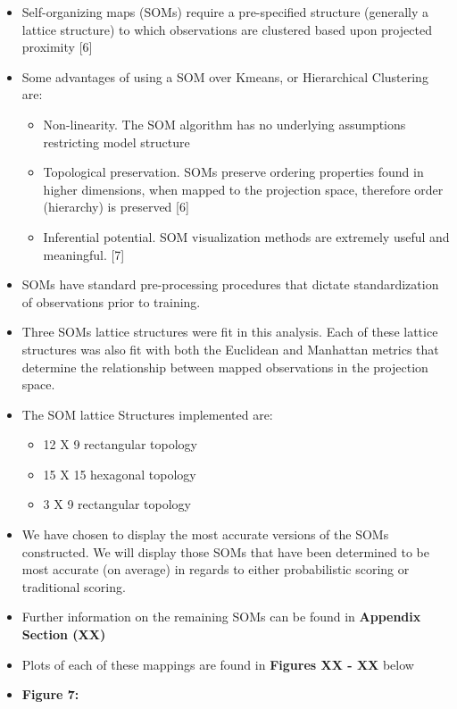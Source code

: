 \documentclass[12pt,]{article}
\providecommand{\tightlist}{%
  \setlength{\itemsep}{0pt}\setlength{\parskip}{0pt}}
\begin{document}
\begin{itemize}
\item
  Self-organizing maps (SOMs) require a pre-specified structure
  (generally a lattice structure) to which observations are clustered
  based upon projected proximity {[}6{]}
\item
  Some advantages of using a SOM over Kmeans, or Hierarchical Clustering
  are:

  \begin{itemize}
  \tightlist
  \item
    Non-linearity. The SOM algorithm has no underlying assumptions
    restricting model structure
  \item
    Topological preservation. SOMs preserve ordering properties found in
    higher dimensions, when mapped to the projection space, therefore
    order (hierarchy) is preserved {[}6{]}
  \item
    Inferential potential. SOM visualization methods are extremely
    useful and meaningful. {[}7{]}
  \end{itemize}
\item
  SOMs have standard pre-processing procedures that dictate
  standardization of observations prior to training.
\item
  Three SOMs lattice structures were fit in this analysis. Each of these
  lattice structures was also fit with both the Euclidean and Manhattan
  metrics that determine the relationship between mapped observations in
  the projection space.
\item
  The SOM lattice Structures implemented are:

  \begin{itemize}
  \tightlist
  \item
    12 X 9 rectangular topology
  \item
    15 X 15 hexagonal topology
  \item
    3 X 9 rectangular topology
  \end{itemize}
\item
  We have chosen to display the most accurate versions of the SOMs
  constructed. We will display those SOMs that have been determined to
  be most accurate (on average) in regards to either probabilistic
  scoring or traditional scoring.
\item
  Further information on the remaining SOMs can be found in
  \textbf{Appendix Section (XX)}
\item
  Plots of each of these mappings are found in \textbf{Figures XX - XX}
  below
\item
  \textbf{Figure 7:}


\end{itemize}
\end{document}
